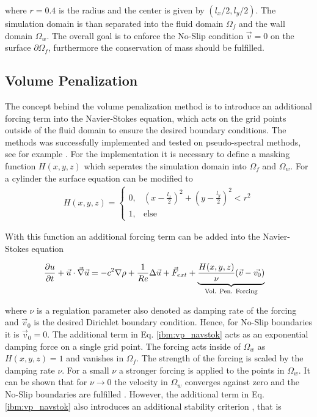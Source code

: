 where $r=0.4$ is the radius and the center is given by $(l_x/2, l_y/2)$.
The simulation domain is than separated into the fluid domain $\Omega_f$ and the wall domain $\Omega_w$.
The overall goal is to enforce the No-Slip condition $\vec{v} = 0$ on the surface $\partial \Omega_f$, furthermore
the conservation of mass should be fulfilled.


\subsection{Volume Penalization}
The concept behind the volume penalization method is to introduce an additional forcing term into the Navier-Stokes equation, which acts on
the grid points outside of the fluid domain to ensure the desired boundary conditions. The methods was successfully implemented and tested
on pseudo-spectral methods, see for example \citep{Lulff2011}.
For the implementation it is necessary to define a masking function $H(x, y, z)$ which seperates the simulation domain into $\Omega_f$ and $\Omega_w$.
For a cylinder the surface equation \label{ibm:eq_cylinder_intro} can be modified to
\begin{align}
    \label{ibm:masking_function}
H(x, y, z) = \begin{cases}
                    0, &  \left(x - \frac{l_x}{2}\right)^2 + \left(y - \frac{l_y}{2}\right)^2 <r^2\\
                    1, & \text{else}
             \end{cases}
\end{align}

With this function an additional forcing term can be added into the Navier-Stokes equation

\begin{align}
    \label{ibm:vp_navstok}
    \pdn[u]{t} + \vec{u} \cdot \vec{\nabla} \vec{u} &= -c^2 \nabla \rho + \frac{1}{Re} \Delta \vec{u} + \vec{F}_{ext}
     +\underbrace{ \frac{H(x, y, z)}{\nu}(\vec{v} - \vec{v_0})}_{\text{Vol. Pen. Forcing}}
\end{align}

where $\nu$ is a regulation parameter also denoted as damping rate of the forcing and $\vec{v}_0$ is the desired Dirichlet boundary condition.
Hence, for No-Slip boundaries it is $\vec{v}_0 = 0 $.
The additional term in Eq. \ref{ibm:vp_navstok} acts as an exponential damping force on a single grid point.
The forcing acts inside of $\Omega_w$ as $H(x, y, z) = 1$ and vanishes in $\Omega_f$.
The strength of the forcing is scaled by the damping rate $\nu$.
For a small $\nu$ a stronger forcing is applied to the points in $\Omega_w$.
It can be shown that for $\nu\rightarrow 0$ the velocity in $\Omega_w$ converges against zero
and the No-Slip boundaries are fulfilled \citep{Lulff2011}.
However, the additional term in Eq. \ref{ibm:vp_navstok}
also introduces an additional stability criterion \citep{Lulff2011}, that is

